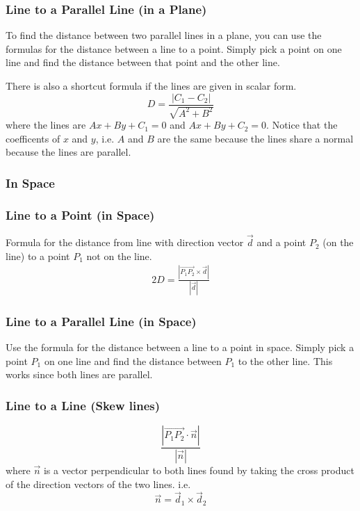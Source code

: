 \documentclass[letterpaper, 12pt]{report}
\theoremstyle{definition}
\numberwithin{equation}{section}
\begin{document}
\subsubsection*{Line to a Parallel Line (in a Plane)}
To find the distance between two parallel lines in a plane, you can use the formulas for the distance between a line to a point. Simply pick a point on one line and find the distance between that point and the other line.

\bigskip \noindent
There is also a shortcut formula if the lines are given in scalar form.
\begin{equation}
	D = \frac{|C_1 - C_2|}{\sqrt{A^2+B^2}}
\end{equation}
where the lines are $Ax+By+C_1=0$ and $Ax+By+C_2=0$. Notice that the coefficents of $x$ and $y$, i.e. $A$ and $B$ are the same because the lines share a normal because the lines are parallel.

\subsubsection{In Space}
\subsubsection*{Line to a Point (in Space)}
Formula for the distance from line with direction vector $\vec d$ and a point $P_2$ (on the line) to a point $P_1$ not on the line.
\begin{alignat*}{2}{}
	D = \frac{|\overrightarrow{P_1P_2} \times \vec d |}{|\vec d|}
\end{alignat*}

\subsubsection{Line to a Parallel Line (in Space)}
Use the formula for the distance between a line to a point in space. Simply pick a point $P_1$ on one line and find the distance between $P_1$ to the other line. This works since both lines are parallel.

\subsubsection{Line to a Line (Skew lines)}
\begin{equation}
	\frac{|\overrightarrow{P_1P_2} \cdot \vec n|}{|\vec n|}
\end{equation}
where $\vec n$ is a vector perpendicular to both lines found by taking the cross product of the direction vectors of the two lines. i.e.
\begin{equation*}
	\vec n = \vec d_1 \times \vec d_2
\end{equation*}
\end{document}
